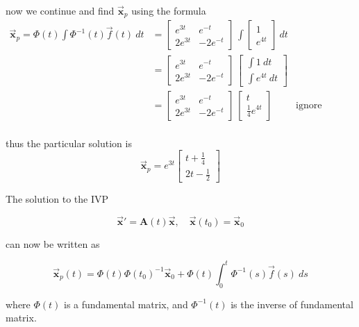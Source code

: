 \begin{solution}
    now we continue and find $\overrightarrow{\mathbf{x}}_p$ using the formula
    \begin{align*}
        \overrightarrow{\mathbf{x}}_p = \Phi (t) \int \Phi^{-1} (t) \overrightarrow{f}(t) \> dt
        &= \begin{bmatrix}
            e^{3t} & e^{-t}\\ 2e^{3t} & -2e^{-t}
        \end{bmatrix} \, \int \begin{bmatrix}
            1 \\ e^{4t}
        \end{bmatrix} \> dt \\[0.8em]
        &= \begin{bmatrix}
            e^{3t} & e^{-t}\\ 2e^{3t} & -2e^{-t}
        \end{bmatrix} \, \begin{bmatrix}
            \int 1 \> dt \\[0.6em]  \int e^{4t} \> dt
        \end{bmatrix}\\
        &= \begin{bmatrix}
            e^{3t} & e^{-t}\\ 2e^{3t} & -2e^{-t}
        \end{bmatrix} \, \begin{bmatrix}
            t \\ \frac{1}{4}e^{4t} 
        \end{bmatrix} & \text{ignore constants}\\
    \end{align*}

    thus the particular solution is 
    \[
        \overrightarrow{\mathbf{x}}_p = e^{3t} \begin{bmatrix}
            t + \frac{1}{4} \\[0.6em] 2t - \frac{1}{2}
        \end{bmatrix}
    \]
\end{solution}

\begin{theorem}
    The solution to the IVP 

    \begin{equation}
        \overrightarrow{\mathbf{x}}' = \mathbf{A}(t) \overrightarrow{\mathbf{x}}, \quad \overrightarrow{\mathbf{x}}(t_0) = \overrightarrow{\mathbf{x}}_0 
    \end{equation}

    can now be written as

    \begin{equation}
        \overrightarrow{\mathbf{x}}_p(t) = \Phi (t) \Phi (t_0)^{-1} \overrightarrow{\mathbf{x}}_0 + \Phi (t) \int^t_0 \Phi^{-1} (s) \overrightarrow{f}(s) \> ds
    \end{equation}

    where $\Phi(t)$ is a fundamental matrix, and $\Phi^{-1}(t)$ is the inverse of fundamental matrix.
\end{theorem}

